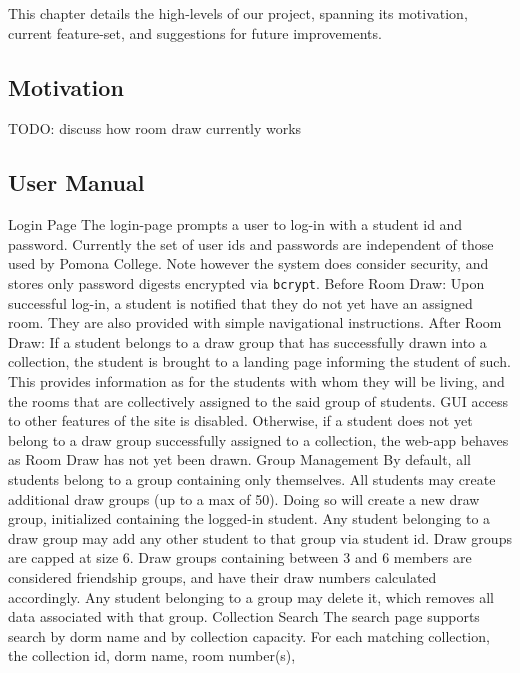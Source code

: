 This chapter details the high-levels of our project, spanning its motivation,
current feature-set, and suggestions for future improvements.

\subsection{Motivation}

TODO: discuss how room draw currently works

\subsection{User Manual}

\begin{outline}
\1 Login Page
  \2 The login-page prompts a user to log-in with a student id and password.
  Currently the set of user ids and passwords are independent of those used by
  Pomona College. Note however the system does consider security, and stores
  only password digests encrypted via \texttt{bcrypt}.
  \2 Before Room Draw:
    \3 Upon successful log-in, a student is notified that they do not yet have
    an assigned room. They are also provided with simple navigational
    instructions.
  \2 After Room Draw:
    \3 If a student belongs to a draw group that has successfully drawn into a
    collection, the student is brought to a landing page informing the student
    of such. This provides information as for the students with whom they will
    be living, and the rooms that are collectively assigned to the said group of
    students. GUI access to other features of the site is disabled.
    \3 Otherwise, if a student does not yet belong to a draw group successfully
    assigned to a collection, the web-app behaves as Room Draw has not yet been
    drawn.
\1 Group Management
  \2 By default, all students belong to a group containing only themselves.
  \2 All students may create additional draw groups (up to a max of 50). Doing
  so will create a new draw group, initialized containing the logged-in student.
  \2 Any student belonging to a draw group may add any other student to that
  group via student id. Draw groups are capped at size 6. Draw groups containing
  between 3 and 6 members are considered friendship groups, and have their draw
  numbers calculated accordingly.
  \2 Any student belonging to a group may delete it, which removes all data
  associated with that group.
\1 Collection Search
  \2 The search page supports search by dorm name and by collection capacity.
  For each matching collection, the collection id, dorm name, room number(s),

\end{outline}
